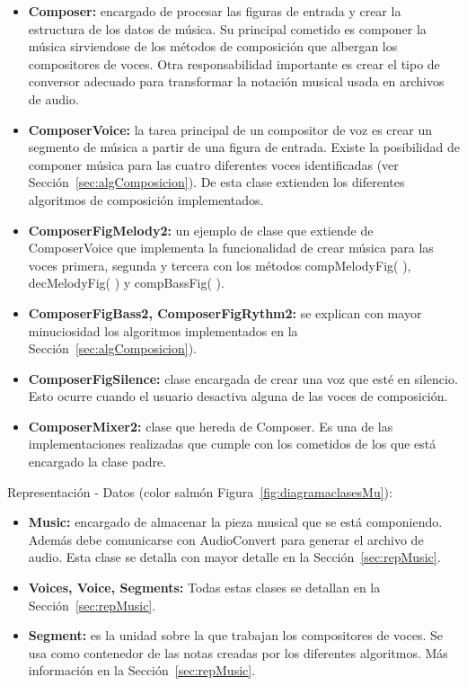 \begin{itemize}
	
	\item \textbf{Composer:} encargado de procesar las figuras de entrada y crear la estructura de los datos de música. Su principal cometido es componer la música sirviendose de los métodos de composición que albergan los compositores de voces. Otra responsabilidad importante es crear el tipo de conversor adecuado para transformar la notación musical usada en archivos de audio.

	\item \textbf{ComposerVoice:} la tarea principal de un compositor de voz es crear un segmento de música a partir de una figura de entrada. Existe la posibilidad de componer música para las cuatro diferentes voces identificadas (ver Sección~\ref{sec:algComposicion}). De esta clase extienden los diferentes algoritmos de composición implementados.

	\item \textbf{ComposerFigMelody2:} un ejemplo de clase que extiende de ComposerVoice que implementa la funcionalidad de crear música para las voces primera, segunda y tercera con los métodos compMelodyFig( ), decMelodyFig( ) y compBassFig( ).

	\item \textbf{ComposerFigBass2, ComposerFigRythm2:} se explican con mayor minuciosidad los algoritmos implementados en la Sección~\ref{sec:algComposicion}).

	\item \textbf{ComposerFigSilence:} clase encargada de crear una voz que esté en silencio. Esto ocurre cuando el usuario desactiva alguna de las voces de composición.

	\item \textbf{ComposerMixer2:} clase que hereda de Composer. Es una de las implementaciones realizadas que cumple con los cometidos de los que está encargado la clase padre.

\end{itemize}

Representación - Datos (color salmón Figura~\ref{fig:diagramaclasesMu}):

\begin{itemize}
	
	\item \textbf{Music:} encargado de almacenar la pieza musical que se está componiendo. Además debe comunicarse con AudioConvert para generar el archivo de audio. Esta clase se detalla con mayor detalle en la Sección~\ref{sec:repMusic}.

	\item \textbf{Voices, Voice, Segments:} Todas estas clases se detallan en la Sección~\ref{sec:repMusic}.

	\item \textbf{Segment:} es la unidad sobre la que trabajan los compositores de voces. Se usa como contenedor de las notas creadas por los diferentes algoritmos. Más información en la Sección~\ref{sec:repMusic}.

\end{itemize}

